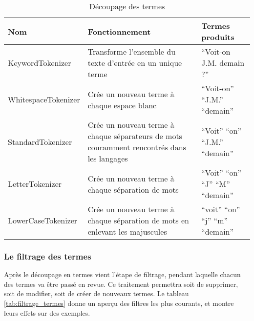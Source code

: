             \begin{table}[!htbp]
                \centering
                \begin{tabular}{|p{4.5cm}|p{4.5cm}|p{4.5cm}|}
                    \hline
                    \textbf{Nom} & \textbf{Fonctionnement} & \textbf{Termes produits}\\
                    \hline
                    KeywordTokenizer & Transforme l’ensemble du texte d’entrée en un unique terme & “Voit-on J.M. demain ?”\\
		\hline
                    WhitespaceTokenizer & Crée un nouveau terme à chaque espace blanc & “Voit-on” “J.M.” “demain”\\
		\hline
                    StandardTokenizer & Crée un nouveau terme à chaque séparateurs de mots couramment rencontrés dans les langages & “Voit” “on” “J.M.” “demain”\\
		\hline
                    LetterTokenizer & Crée un nouveau terme à chaque séparation de mots & “Voit” “on” “J” “M” “demain”\\
		\hline
                    LowerCaseTokenizer & Crée un nouveau terme à chaque séparation de mots en enlevant les majuscules & “voit” “on” “j” “m” “demain”\\
                    \hline

                \end{tabular}
                \caption{Découpage des termes}
                \label{tab:decoupage_termes}
            \end{table}

\subsubsection{Le filtrage des termes}
\label{section:filtres}

Après le découpage en termes vient l’étape de filtrage, pendant laquelle chacun des termes va être passé en revue. Ce traitement permettra soit de supprimer, soit de modifier, soit de créer de nouveaux termes. Le tableau \ref{tab:filtrage_termes} donne un aperçu des filtres les plus courants, et montre leurs effets sur des exemples.

